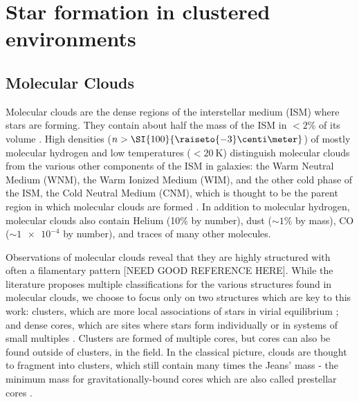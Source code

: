 \chapter{Star formation in clustered environments} %

\label{chap:StarFormation}



\section{Molecular Clouds}

Molecular clouds are the dense regions of the interstellar medium (ISM) where stars are forming. They contain about half the mass of the ISM in $<2$\% of its volume \citep{Ferriere:2001gv}. High densities ($n > \SI{100}{\raiseto{-3}\centi\meter}$) of mostly molecular hydrogen and low temperatures ($< \SI{20}{\kelvin}$) distinguish molecular clouds from the various other components of the ISM in galaxies: the Warm Neutral Medium (WNM), the Warm Ionized Medium (WIM), and the other cold phase of the ISM, the Cold Neutral Medium (CNM), which is thought to be the parent region in which molecular clouds are formed \citep{Kennicutt:2012ey}. In addition to molecular hydrogen, molecular clouds also contain Helium (10\% by number), dust ($\sim 1\%$ by mass), CO ($\sim \num{1e-4}$ by number), and traces of many other molecules.

Observations of molecular clouds reveal that they are highly structured with often a filamentary pattern [NEED GOOD REFERENCE HERE]. While the literature proposes multiple classifications for the various structures found in molecular clouds, we choose to focus only on two structures which are key to this work: clusters, which are more local associations of stars in virial equilibrium \citep{Lada:2003il}; and dense cores, which are sites where stars form individually or in systems of small multiples \citep{Williams:2000wl}. Clusters are formed of multiple cores, but cores can also be found outside of clusters, in the field. In the classical picture, clouds are thought to fragment into clusters, which still contain many times the Jeans' mass - the minimum mass for gravitationally-bound cores \citep{Larson:1994cj} which are also called prestellar cores \citep{DiFrancesco:2007vg}.


